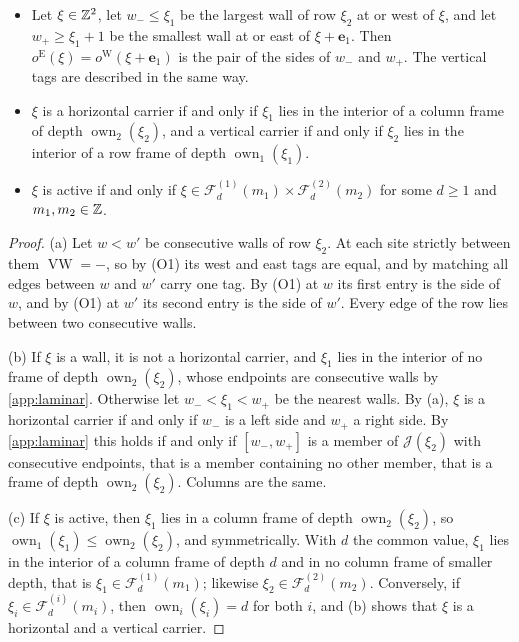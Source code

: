 \begin{proposition}[Routing]\label{prop:routing}
\begin{itemize}
\item[(a)] Let $\xi\in\mathbb{Z}^2$, let $w_-\le\xi_1$ be the largest wall of row $\xi_2$ at or west of $\xi$, and let $w_+\ge\xi_1+1$ be the smallest wall at or east of $\xi+\mathbf e_1$. Then $o^{\mathrm E}(\xi)=o^{\mathrm W}(\xi+\mathbf e_1)$ is the pair of the sides of $w_-$ and $w_+$. The vertical tags are described in the same way.
\item[(b)] $\xi$ is a horizontal carrier if and only if $\xi_1$ lies in the interior of a column frame of depth $\operatorname{own}_2(\xi_2)$, and a vertical carrier if and only if $\xi_2$ lies in the interior of a row frame of depth $\operatorname{own}_1(\xi_1)$.
\item[(c)] $\xi$ is active if and only if $\xi\in\mathcal F^{(1)}_d(m_1)\times\mathcal F^{(2)}_d(m_2)$ for some $d\ge1$ and $m_1,m_2\in\mathbb{Z}$.
\end{itemize}
\end{proposition}

\begin{proof}
(a) Let $w<w'$ be consecutive walls of row $\xi_2$. At each site strictly between them $\operatorname{VW}=-$, so by (O1) its west and east tags are equal, and by matching all edges between $w$ and $w'$ carry one tag. By (O1) at $w$ its first entry is the side of $w$, and by (O1) at $w'$ its second entry is the side of $w'$. Every edge of the row lies between two consecutive walls.

(b) If $\xi$ is a wall, it is not a horizontal carrier, and $\xi_1$ lies in the interior of no frame of depth $\operatorname{own}_2(\xi_2)$, whose endpoints are consecutive walls by \cref{app:laminar}. Otherwise let $w_-<\xi_1<w_+$ be the nearest walls. By (a), $\xi$ is a horizontal carrier if and only if $w_-$ is a left side and $w_+$ a right side. By \cref{app:laminar} this holds if and only if $[w_-,w_+]$ is a member of $\mathcal J(\xi_2)$ with consecutive endpoints, that is a member containing no other member, that is a frame of depth $\operatorname{own}_2(\xi_2)$. Columns are the same.

(c) If $\xi$ is active, then $\xi_1$ lies in a column frame of depth $\operatorname{own}_2(\xi_2)$, so $\operatorname{own}_1(\xi_1)\le\operatorname{own}_2(\xi_2)$, and symmetrically. With $d$ the common value, $\xi_1$ lies in the interior of a column frame of depth $d$ and in no column frame of smaller depth, that is $\xi_1\in\mathcal F^{(1)}_d(m_1)$; likewise $\xi_2\in\mathcal F^{(2)}_d(m_2)$. Conversely, if $\xi_i\in\mathcal F^{(i)}_d(m_i)$, then $\operatorname{own}_i(\xi_i)=d$ for both $i$, and (b) shows that $\xi$ is a horizontal and a vertical carrier.
\end{proof}

